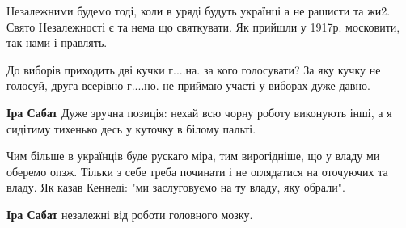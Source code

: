 \begin{itemize}
\begin{itemize}
\begin{itemize}
Незалежними будемо тоді, коли в уряді будуть українці а не рашисти та жи2.
Свято Незалежності є та нема що святкувати. Як прийшли у 1917р. московити, так
нами і правлять.

\end{itemize}

 

До виборів приходить дві кучки г....на. за кого голосувати? За яку кучку не
голосуй, друга всерівно г....но. не приймаю участі у виборах дуже давно.

\begin{itemize}
 
\textbf{Іра Сабат} Дуже зручна позиція: нехай всю чорну роботу виконують інші, а я сидітиму тихенько
десь у куточку в білому пальті.
\end{itemize}

 

Чим більше в українців буде рускаго міра, тим вирогідніше, що у владу ми
оберемо опзж. Тільки з себе треба починати і не оглядатися на оточуючих та
владу. Як казав Кеннеді: "ми заслуговуємо на ту владу, яку обрали".


 
\textbf{Іра Сабат} незалежні від роботи головного мозку.

\end{itemize}

 


\end{itemize}
